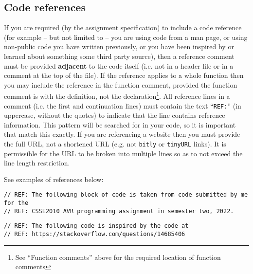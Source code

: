 \documentclass{article}
\begin{document}
\subsection{Code references}
If you are required (by the assignment specification) 
to include a code reference (for example -- but not limited to -- you are using code from a man page, or using non-public code you have 
written previously, or you have been inspired by or learned about something some third party source), then a reference comment must be provided
\textbf{adjacent} to the code itself (i.e. not in a header file or in a comment at the top of the file). If the reference applies to a whole
function then you may include the reference in the function comment, provided the function comment is with the definition, not the declaration\footnote{See ``Function comments'' above for the required location of function comments}. All reference lines 
in a comment (i.e. the first and continuation lines) must contain the text ``\texttt{REF:}'' (in uppercase, 
without the quotes) to indicate that the line contains reference information. This pattern will be searched for in your code, so it is important that match this exactly. If you are referencing a website then you must provide the full URL, not a shortened URL (e.g. not \texttt{bitly} or \texttt{tinyURL} links). 
It is permissible for the URL to be broken into multiple lines so as to not exceed the line length restriction.

See examples of references below:

\nolinenumbers
{}
\begin{lstlisting}
// REF: The following block of code is taken from code submitted by me for the
// REF: CSSE2010 AVR programming assignment in semester two, 2022. 
\end{lstlisting}

\begin{lstlisting}
// REF: The following code is inspired by the code at 
// REF: https://stackoverflow.com/questions/14685406
\end{lstlisting}
\end{document}
